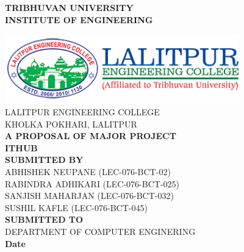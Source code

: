 \documentclass[12 pt]{article}
\begin{document}
\begin{center}

    \thispagestyle{empty}
    {\fontsize{16 pt}{12} \selectfont\textbf{TRIBHUVAN UNIVERSITY} \\
        \textbf{INSTITUTE OF ENGINEERING}} \\
    \vspace{0.3 in}

    \includegraphics[width= 4in ]{leclogo21.png} \\
    \vspace{0.05 in}
    LALITPUR ENGINEERING COLLEGE \\
    KHOLKA POKHARI, LALITPUR \\

    \vspace{0.5 in}
    \textbf{ A PROPOSAL OF MAJOR PROJECT}\\
    {\fontsize{14 pt}{12} \selectfont \textbf{ITHUB}}\\
    \vspace{1.1 in}
    \textbf{ SUBMITTED BY}  \\
    ABHISHEK NEUPANE (LEC-076-BCT-02)   \\
    RABINDRA ADHIKARI (LEC-076-BCT-025) \\
    SANJISH MAHARJAN (LEC-076-BCT-032)  \\
    SUSHIL KAFLE (LEC-076-BCT-045)  \\
    \vspace{1.1 in}
    \textbf{ SUBMITTED TO}  \\
    DEPARTMENT OF COMPUTER ENGINERING \\
    \vspace{0.5 in}
    \textbf{Date} \\
\end{center}
\newpage
\end{document}
